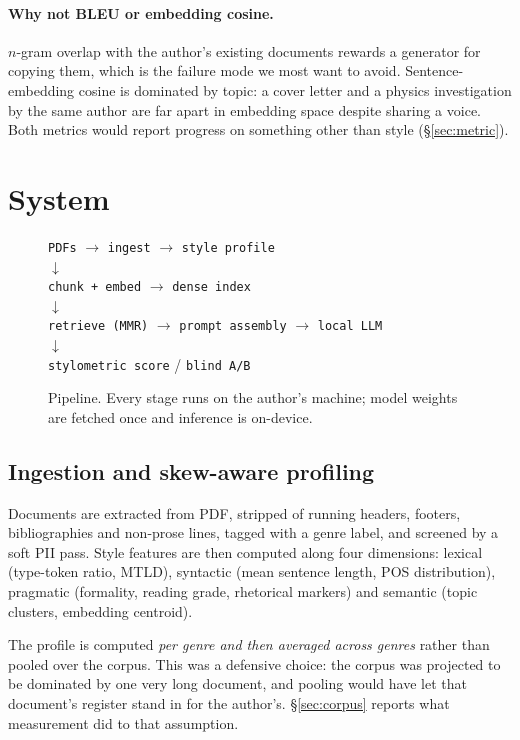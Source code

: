 \documentclass[11pt]{article}
\begin{document}
\paragraph{Why not BLEU or embedding cosine.}
$n$-gram overlap with the author's existing documents rewards a generator for
copying them, which is the failure mode we most want to avoid. Sentence-embedding
cosine is dominated by topic: a cover letter and a physics investigation by the
same author are far apart in embedding space despite sharing a voice. Both
metrics would report progress on something other than style
(\S\ref{sec:metric}).

\section{System}
\label{sec:system}

\begin{figure}[t]
\centering
\small
\texttt{PDFs} $\rightarrow$ \texttt{ingest} $\rightarrow$ \texttt{style profile} \\[2pt]
$\downarrow$ \\[2pt]
\texttt{chunk + embed} $\rightarrow$ \texttt{dense index} \\[2pt]
$\downarrow$ \\[2pt]
\texttt{retrieve (MMR)} $\rightarrow$ \texttt{prompt assembly} $\rightarrow$ \texttt{local LLM} \\[2pt]
$\downarrow$ \\[2pt]
\texttt{stylometric score} \;/\; \texttt{blind A/B}
\caption{Pipeline. Every stage runs on the author's machine; model weights are
fetched once and inference is on-device.}
\label{fig:pipeline}
\end{figure}

\subsection{Ingestion and skew-aware profiling}
\label{sec:profiling}

Documents are extracted from PDF, stripped of running headers, footers,
bibliographies and non-prose lines, tagged with a genre label, and screened by a
soft PII pass. Style features are then computed along four dimensions: lexical
(type-token ratio, MTLD), syntactic (mean sentence length, POS distribution),
pragmatic (formality, reading grade, rhetorical markers) and semantic
(topic clusters, embedding centroid).

The profile is computed \emph{per genre and then averaged across genres} rather
than pooled over the corpus. This was a defensive choice: the corpus was
projected to be dominated by one very long document, and pooling would have let
that document's register stand in for the author's. \S\ref{sec:corpus} reports
what measurement did to that assumption.
\end{document}
